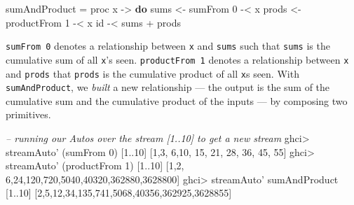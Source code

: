 \documentclass[]{article}
\newenvironment{Shaded}{}{}
\newcommand{\KeywordTok}[1]{\textcolor[rgb]{0.00,0.44,0.13}{\textbf{{#1}}}}
\newcommand{\DecValTok}[1]{\textcolor[rgb]{0.25,0.63,0.44}{{#1}}}
\newcommand{\CommentTok}[1]{\textcolor[rgb]{0.38,0.63,0.69}{\textit{{#1}}}}
\newcommand{\OtherTok}[1]{\textcolor[rgb]{0.00,0.44,0.13}{{#1}}}
\newcommand{\FunctionTok}[1]{\textcolor[rgb]{0.02,0.16,0.49}{{#1}}}
\newcommand{\NormalTok}[1]{{#1}}
\begin{document}
\begin{Shaded}
\begin{Highlighting}[]
\NormalTok{sumAndProduct }\FunctionTok{=} \NormalTok{proc x }\OtherTok{->} \KeywordTok{do}
    \NormalTok{sums  }\OtherTok{<-} \NormalTok{sumFrom }\DecValTok{0}     \FunctionTok{-<} \NormalTok{x}
    \NormalTok{prods }\OtherTok{<-} \NormalTok{productFrom }\DecValTok{1} \FunctionTok{-<} \NormalTok{x}
    \NormalTok{id }\FunctionTok{-<} \NormalTok{sums }\FunctionTok{+} \NormalTok{prods}
\end{Highlighting}
\end{Shaded}

\texttt{sumFrom\ 0} denotes a relationship between \texttt{x} and
\texttt{sums} such that \texttt{sums} is the cumulative sum of all
\texttt{x}'s seen. \texttt{productFrom\ 1} denotes a relationship
between \texttt{x} and \texttt{prods} that \texttt{prods} is the
cumulative product of all \texttt{x}s seen. With \texttt{sumAndProduct},
we \emph{built} a new relationship --- the output is the sum of the
cumulative sum and the cumulative product of the inputs --- by composing
two primitives.

\begin{Shaded}
\begin{Highlighting}[]
\CommentTok{-- running our Autos over the stream [1..10] to get a new stream}
\NormalTok{ghci}\FunctionTok{>} \NormalTok{streamAuto' (sumFrom }\DecValTok{0}\NormalTok{) [}\DecValTok{1}\FunctionTok{..}\DecValTok{10}\NormalTok{]}
\NormalTok{[}\DecValTok{1}\NormalTok{,}\DecValTok{3}\NormalTok{, }\DecValTok{6}\NormalTok{,}\DecValTok{10}\NormalTok{, }\DecValTok{15}\NormalTok{, }\DecValTok{21}\NormalTok{,  }\DecValTok{28}\NormalTok{,   }\DecValTok{36}\NormalTok{,    }\DecValTok{45}\NormalTok{,     }\DecValTok{55}\NormalTok{]}
\NormalTok{ghci}\FunctionTok{>} \NormalTok{streamAuto' (productFrom }\DecValTok{1}\NormalTok{) [}\DecValTok{1}\FunctionTok{..}\DecValTok{10}\NormalTok{]}
\NormalTok{[}\DecValTok{1}\NormalTok{,}\DecValTok{2}\NormalTok{, }\DecValTok{6}\NormalTok{,}\DecValTok{24}\NormalTok{,}\DecValTok{120}\NormalTok{,}\DecValTok{720}\NormalTok{,}\DecValTok{5040}\NormalTok{,}\DecValTok{40320}\NormalTok{,}\DecValTok{362880}\NormalTok{,}\DecValTok{3628800}\NormalTok{]}
\NormalTok{ghci}\FunctionTok{>} \NormalTok{streamAuto' sumAndProduct [}\DecValTok{1}\FunctionTok{..}\DecValTok{10}\NormalTok{]}
\NormalTok{[}\DecValTok{2}\NormalTok{,}\DecValTok{5}\NormalTok{,}\DecValTok{12}\NormalTok{,}\DecValTok{34}\NormalTok{,}\DecValTok{135}\NormalTok{,}\DecValTok{741}\NormalTok{,}\DecValTok{5068}\NormalTok{,}\DecValTok{40356}\NormalTok{,}\DecValTok{362925}\NormalTok{,}\DecValTok{3628855}\NormalTok{]}
\end{Highlighting}
\end{Shaded}
\end{document}
